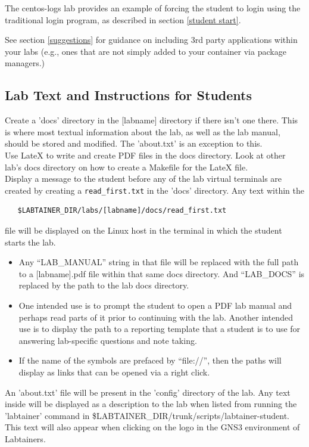 \documentclass[12pt]{article}
\begin{document}
The centos-logs lab provides an example of forcing the student to login using the traditional
login program, as described in section \ref{student start}.

See section \ref{suggestions} for guidance on including 3rd party applications within your labs (e.g., ones that are
not simply added to your container via package managers.)


\subsection {Lab Text and Instructions for Students} \label{instructions}
Create a 'docs' directory in the [labname] directory if there isn't one there. This is where most textual information about the lab, as well as the lab manual, should be stored and modified. The 'about.txt' is an exception to this. \\ 

\noindent Use LateX to write and create PDF files in the docs directory. Look at other lab's docs directory on how to create a Makefile for the LateX file. \\ 

\noindent Display a message to the student before any 
of the lab virtual terminals are created by creating a {\tt read\_first.txt} in the 'docs' directory. Any text within the 
\begin{verbatim}
   $LABTAINER_DIR/labs/[labname]/docs/read_first.txt
\end{verbatim}
\noindent file will be displayed on the Linux host in the terminal in which the student
starts the lab.  
\begin{itemize}
	\item Any ``LAB\_MANUAL'' string in that file will be replaced with the full path
to a [labname].pdf file within that same docs directory. And ``LAB\_DOCS'' is replaced by the path to the lab docs directory.  
	\item One intended use is to prompt the student to open a PDF lab manual and perhaps read parts of it prior to continuing with the lab. Another intended use is to display the path to a reporting template that a student is to use for answering lab-specific questions and note taking. 
	\item If the name of the symbols are prefaced by ``file://'', then the paths will display as links that can be opened via a right click.
\end{itemize}
	

\noindent An 'about.txt' file will be present in the 'config' directory of the lab. Any text inside will be displayed as a description to the lab when listed from running the 'labtainer' command in \$LABTAINER\_DIR/trunk/scripts/labtainer-student. This text will also appear when clicking on the logo in the GNS3 environment of Labtainers. \\ 
\end{document}

